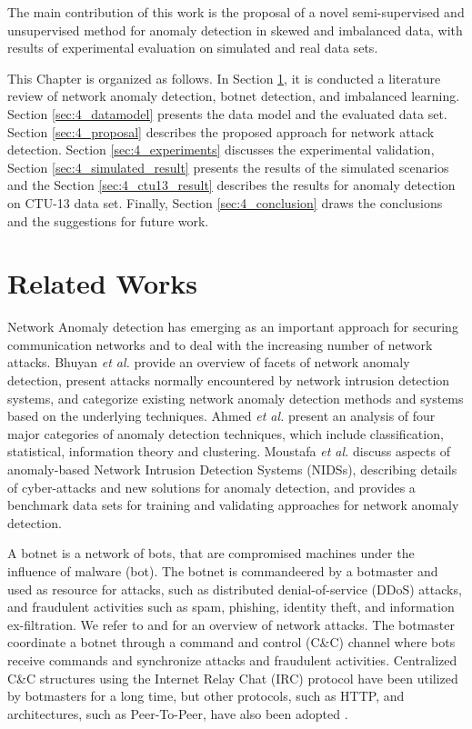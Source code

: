 The main contribution of this work is the proposal of a novel semi-supervised and unsupervised method for anomaly detection in skewed and imbalanced data, with results of experimental evaluation on simulated and real data sets.

This Chapter is organized as follows. In Section \ref{sec:4_relatedworks}, it is conducted a literature review of network anomaly detection, botnet detection, and imbalanced learning. Section \ref{sec:4_datamodel} presents the data model and the evaluated data set. Section \ref{sec:4_proposal} describes the proposed approach for network attack detection. Section \ref{sec:4_experiments} discusses the experimental validation, Section \ref{sec:4_simulated_result} presents the results of the simulated scenarios and the Section \ref{sec:4_ctu13_result} describes the results for anomaly detection on CTU-13 data set. Finally, Section \ref{sec:4_conclusion} draws the conclusions and the suggestions for future work.


\section{Related Works}
\label{sec:4_relatedworks}

Network Anomaly detection has emerging as an important approach for securing communication networks and to deal with the increasing number of network attacks. Bhuyan \emph{et al.} \cite{bhuyan2014network} provide an overview of facets of network anomaly detection, present attacks normally encountered by network intrusion detection systems, and categorize existing network anomaly detection methods and systems based on the underlying techniques. Ahmed \emph{et al.} \cite{ahmed2016survey} present an analysis of four major categories of anomaly detection techniques, which include classification, statistical, information theory and clustering. Moustafa \emph{et al.} \cite{moustafa2019holistic} discuss aspects of anomaly-based Network Intrusion Detection Systems (NIDSs), describing details of cyber-attacks and new solutions for anomaly detection, and provides a benchmark data sets for training and validating approaches for network anomaly detection.

A botnet is a network of bots, that are compromised machines under the influence of malware (bot). The botnet is commandeered by a botmaster and used as resource for attacks, such as distributed denial-of-service (DDoS) attacks, and fraudulent activities such as spam, phishing, identity theft, and information ex-filtration. We refer to \cite{ahmed2016survey} and \cite{moustafa2019holistic} for an overview of network attacks. The botmaster coordinate a botnet through a command and control (C\&C) channel where bots receive commands and synchronize attacks and fraudulent activities. Centralized C\&C structures using the Internet Relay Chat (IRC) protocol have been utilized by botmasters for a long time, but other protocols, such as HTTP, and architectures, such as Peer-To-Peer, have also been adopted \cite{gu2008botminer}.

